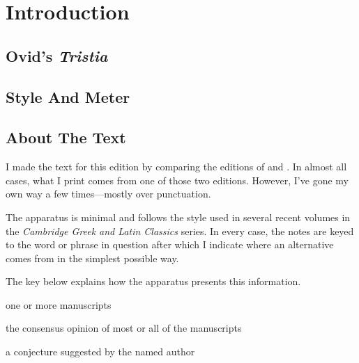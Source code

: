 \chapter*{Introduction}

\section*{Ovid's \textit{Tristia}}

\section*{Style And Meter}

\section*{About The Text}

I made the text for this edition by comparing the editions of \citet{owen1915}
and \citet{hall1998}. In almost all cases, what I print comes from one of those
two editions. However, I've gone my own way a few times---mostly over
punctuation.

The apparatus is minimal and follows the style used in several recent volumes
in the \textit{Cambridge Greek and Latin Classics} series. In every case, the
notes are keyed to the word or phrase in question after which I indicate
where an alternative comes from in the simplest possible way.

The key below explains how the apparatus presents this information.

\begin{description}%
    [style=sameline,leftmargin=70pt,labelwidth=\widthof{\textbf{Name}}]
    \item[m] one or more manuscripts
    \item[mss] the consensus opinion of most or all of the manuscripts
    \item[Name] a conjecture suggested by the named author
\end{description}
